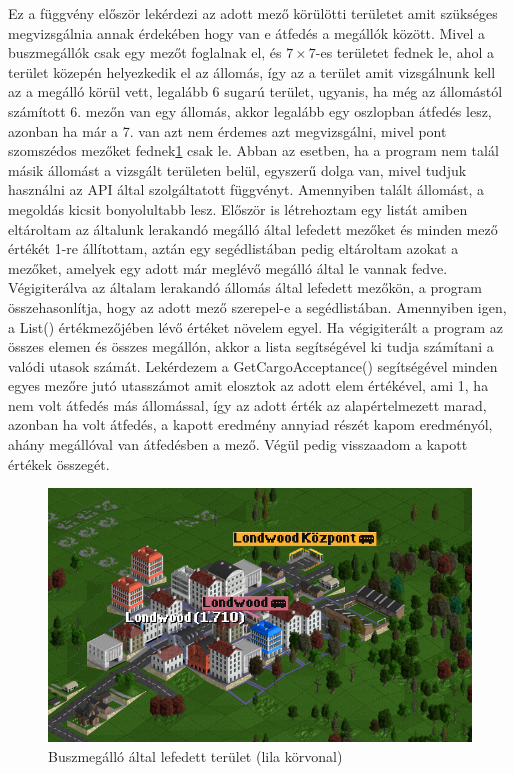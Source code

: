 Ez a függvény először lekérdezi az adott mező körülötti területet amit szükséges megvizsgálnia annak érdekében hogy van e átfedés a megállók között. Mivel a buszmegállók csak egy mezőt foglalnak el, és $7 \times 7$-es területet fednek le, ahol a terület közepén helyezkedik el az állomás, így az a terület amit vizsgálnunk kell az a megálló körül vett, legalább 6 sugarú terület, ugyanis, ha még az állomástól számított 6. mezőn van egy állomás, akkor legalább egy oszlopban átfedés lesz, azonban ha már a 7. van azt nem érdemes azt megvizsgálni, mivel pont szomszédos mezőket fednek\ref{fig:megallo} csak le. Abban az esetben, ha a program nem talál másik állomást a vizsgált területen belül, egyszerű dolga van, mivel tudjuk használni az API által szolgáltatott függvényt. Amennyiben talált állomást, a megoldás kicsit bonyolultabb lesz. Először is létrehoztam egy listát amiben eltároltam az általunk lerakandó megálló által lefedett mezőket és minden mező értékét 1-re állítottam, aztán egy segédlistában pedig eltároltam azokat a mezőket, amelyek egy adott már meglévő megálló által le vannak fedve. Végigiterálva az általam lerakandó állomás által lefedett mezőkön, a program összehasonlítja, hogy az adott mező szerepel-e a segédlistában. Amennyiben igen, a List() értékmezőjében lévő értéket növelem egyel. Ha végigiterált a program az összes elemen és összes megállón, akkor a lista segítségével ki tudja számítani a valódi utasok számát. Lekérdezem a GetCargoAcceptance() segítségével minden egyes mezőre jutó utasszámot amit elosztok az adott elem értékével, ami 1, ha nem volt átfedés más állomással, így az adott érték az alapértelmezett marad, azonban ha volt átfedés, a kapott eredmény annyiad részét kapom eredményól, ahány megállóval van átfedésben a mező. Végül pedig visszaadom a kapott értékek összegét.

\begin{figure}
	\centering
	\includegraphics[scale=0.8]{images/megallo.png}
	\caption{Buszmegálló által lefedett terület (lila körvonal)}
	\label{fig:megallo}
\end{figure}

